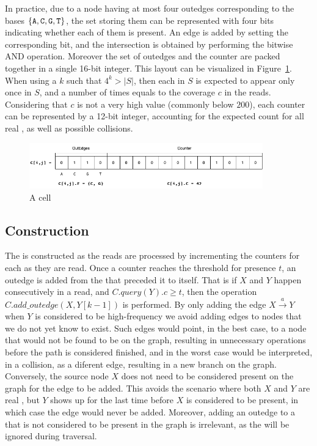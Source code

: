 In practice, due to a node having at most four outedges corresponding to the bases $\{\mathtt{A}, \mathtt{C}, \mathtt{G}, \mathtt{T}\}$, the set storing them can be represented with four bits indicating whether each of them is present. An edge is added by setting the corresponding bit, and the intersection is obtained by performing the bitwise AND operation. Moreover the set of outedges and the counter are packed together in a single 16-bit integer. This layout can be visualized in Figure~\ref{fig:dbcm-bit_use}. When using a $k$ such that $4^k > |S|$, then each \kmer in $S$ is expected to appear only once in $S$, and a number of times equals to the coverage $c$ in the reads. Considering that $c$ is not a very high value (commonly below $200$), each counter can be represented by a 12-bit integer, accounting for the expected count for all real , as well as possible collisions.

\begin{figure}[htbp]
  \centering
  \includegraphics[width=0.9\textwidth]{figures/dbcm-bit_use}
  \caption{A \dBCM cell}\label{fig:dbcm-bit_use}
\end{figure}

\subsection{\dBCM Construction}
\label{subsubsec:dbcm-construction}

The \dBCM is constructed as the reads are processed by incrementing the counters for each \kmer as they are read. Once a  counter reaches the threshold for presence $t$, an outedge is added from the \kmer that preceded it to itself. That is if  $X$ and $Y$ happen consecutively in a read, and $C.\mathit{query}(Y).c \geq t$, then the operation $C.\mathit{add\_outedge}(X, Y[k-1])$ is performed. 
%
By only adding the edge $X\stackrel{a}{\longrightarrow}Y$ when $Y$ is considered to be high-frequency we avoid adding edges to nodes that we do not yet know to exist. Such edges would point, in the best case, to a node that would not be found to be on the graph, resulting in unnecessary operations before the path is considered finished, and in the worst case would be interpreted, in a collision, as a diferent edge, resulting in a new branch on the graph. Conversely, the source node $X$ does not need to be considered present on the graph for the edge to be added. This avoids the scenario where both $X$ and $Y$ are real , but $Y$ shows up for the last time before $X$ is considered to be present, in which case the edge would never be added. Moreover, adding an outedge to a \kmer that is not considered to be present in the graph is irrelevant, as the \kmer will be ignored during traversal. 

